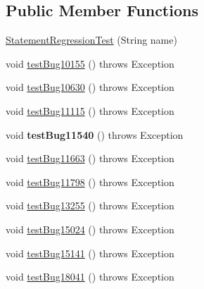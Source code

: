 \subsection*{Public Member Functions}
\begin{DoxyCompactItemize}
\item 
\mbox{\hyperlink{classtestsuite_1_1regression_1_1_statement_regression_test_a8e0f198acfbe47561686edd750a55349}{Statement\+Regression\+Test}} (String name)
\item 
void \mbox{\hyperlink{classtestsuite_1_1regression_1_1_statement_regression_test_a662e79a8152a1c9cefcfde5ea2a7c046}{test\+Bug10155}} ()  throws Exception 
\item 
void \mbox{\hyperlink{classtestsuite_1_1regression_1_1_statement_regression_test_a5cd95ffb44229da2afd247495385088c}{test\+Bug10630}} ()  throws Exception 
\item 
void \mbox{\hyperlink{classtestsuite_1_1regression_1_1_statement_regression_test_a5eed5fd0591511a13f3159bd29366e80}{test\+Bug11115}} ()  throws Exception 
\item 
\mbox{\label{classtestsuite_1_1regression_1_1_statement_regression_test_a604d1382ce11355dcdefb57bccf8fc4b}} 
void {\bfseries test\+Bug11540} ()  throws Exception 
\item 
void \mbox{\hyperlink{classtestsuite_1_1regression_1_1_statement_regression_test_aad9a4a5d28e804097e535c055838a4e6}{test\+Bug11663}} ()  throws Exception 
\item 
void \mbox{\hyperlink{classtestsuite_1_1regression_1_1_statement_regression_test_a2e9381e517b516fe84e4574229646579}{test\+Bug11798}} ()  throws Exception 
\item 
void \mbox{\hyperlink{classtestsuite_1_1regression_1_1_statement_regression_test_a19979b206b845d9832b82138c997334b}{test\+Bug13255}} ()  throws Exception 
\item 
void \mbox{\hyperlink{classtestsuite_1_1regression_1_1_statement_regression_test_a91138e5fec8feb1b3680bca0bad7700d}{test\+Bug15024}} ()  throws Exception 
\item 
void \mbox{\hyperlink{classtestsuite_1_1regression_1_1_statement_regression_test_a8a46a6b40cf258db53a37cc247872520}{test\+Bug15141}} ()  throws Exception 
\item 
void \mbox{\hyperlink{classtestsuite_1_1regression_1_1_statement_regression_test_a0f8ea527be14f3f0a245ffcfb36f0c58}{test\+Bug18041}} ()  throws Exception 

\end{DoxyCompactItemize}
